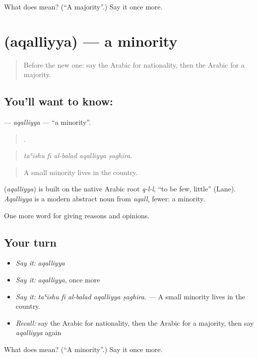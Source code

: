 \begin{tcolorbox}[breakable,colback=teal!4,colframe=teal!35!black,title={Before you move on}]
What does  mean? (\textquotedblleft{}A majority\textquotedblright{}.) Say it once more.
\end{tcolorbox}
\section[\texorpdfstring{\ar{أقلية} (aqalliyya)}{أقلية (aqalliyya)}]{ (aqalliyya) — a minority}

\label{lesson:AR-C387-aqalliyya}



\begin{quote}
Before the new one: say the Arabic for nationality, then the Arabic for a majority.
\end{quote}

\subsection*{You'll want to know: }
\textbf{} — \emph{aqalliyya} — \textquotedblleft{}a minority\textquotedblright{}.

\begin{quote}
    .
\end{quote}

\begin{quote}
\emph{taʿīshu fī al-balad aqalliyya ṣaghīra.}
\end{quote}

\begin{quote}
A small minority lives in the country.
\end{quote}

\begin{cousinweb}
\textbf{} (\emph{aqalliyya}) is built on the native Arabic root \emph{q-l-l}, \textquotedblleft{}to be few, little\textquotedblright{} (Lane). \emph{Aqalliyya} is a modern abstract noun from \emph{aqall}, fewer: a minority.
\end{cousinweb}

\begin{grammarlens}[title={What you've built}]
One more word for giving reasons and opinions.
\end{grammarlens}

\subsection*{Your turn}
\begin{itemize}
\raggedright
  \item \emph{Say it:} \emph{aqalliyya}
  \item \emph{Say it:} \emph{aqalliyya}, once more
  \item \emph{Say it:} \emph{taʿīshu fī al-balad aqalliyya ṣaghīra.} — A small minority lives in the country.
  \item \emph{Recall:} say the Arabic for nationality, then the Arabic for a majority, then say \emph{aqalliyya} again
\end{itemize}

\begin{tcolorbox}[breakable,colback=teal!4,colframe=teal!35!black,title={Before you move on}]
What does  mean? (\textquotedblleft{}A minority\textquotedblright{}.) Say it once more.
\end{tcolorbox}
